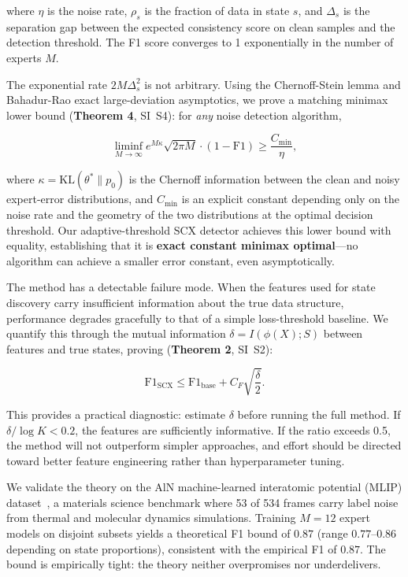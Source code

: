 where $\eta$ is the noise rate, $\rho_s$ is the fraction of data in state $s$, and $\Delta_s$ is the separation gap between the expected consistency score on clean samples and the detection threshold. The F1 score converges to 1 exponentially in the number of experts $M$.

The exponential rate $2M\Delta_s^2$ is not arbitrary. Using the Chernoff-Stein lemma and Bahadur-Rao exact large-deviation asymptotics, we prove a matching minimax lower bound (\textbf{Theorem 4}, SI~S4): for \emph{any} noise detection algorithm,

\begin{equation}
\liminf_{M\to\infty} e^{M\kappa} \sqrt{2\pi M} \cdot (1 - \mathrm{F1}) \geq \frac{C_{\min}}{\eta},
\end{equation}

where $\kappa = \mathrm{KL}(\theta^* \| p_0)$ is the Chernoff information between the clean and noisy expert-error distributions, and $C_{\min}$ is an explicit constant depending only on the noise rate and the geometry of the two distributions at the optimal decision threshold. Our adaptive-threshold SCX detector achieves this lower bound with equality, establishing that it is \textbf{exact constant minimax optimal}---no algorithm can achieve a smaller error constant, even asymptotically.

The method has a detectable failure mode. When the features used for state discovery carry insufficient information about the true data structure, performance degrades gracefully to that of a simple loss-threshold baseline. We quantify this through the mutual information $\delta = I(\phi(X); S)$ between features and true states, proving (\textbf{Theorem 2}, SI~S2):

\begin{equation}
\mathrm{F1}_{\mathrm{SCX}} \leq \mathrm{F1}_{\mathrm{base}} + C_F \sqrt{\frac{\delta}{2}}.
\end{equation}

This provides a practical diagnostic: estimate $\delta$ before running the full method. If $\delta / \log K < 0.2$, the features are sufficiently informative. If the ratio exceeds 0.5, the method will not outperform simpler approaches, and effort should be directed toward better feature engineering rather than hyperparameter tuning.

We validate the theory on the AlN machine-learned interatomic potential (MLIP) dataset~\cite{...}, a materials science benchmark where 53 of 534 frames carry label noise from thermal and molecular dynamics simulations. Training $M=12$ expert models on disjoint subsets yields a theoretical F1 bound of $0.87$ (range $0.77$--$0.86$ depending on state proportions), consistent with the empirical F1 of $0.87$. The bound is empirically tight: the theory neither overpromises nor underdelivers.

